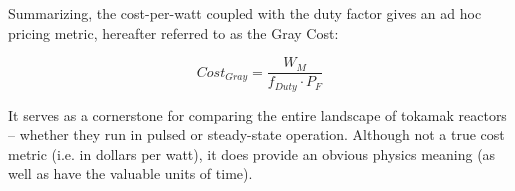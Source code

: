 Summarizing, the cost-per-watt coupled with the duty factor gives an ad hoc pricing metric, hereafter referred to as the Gray Cost:

\begin{equation}
	Cost_{Gray} = \frac{W_M}{f_{Duty} \cdot P_F}
\end{equation}

It serves as a cornerstone for comparing the entire landscape of tokamak reactors -- whether they run in pulsed or steady-state operation. Although not a true cost metric (i.e. in dollars per watt), it does provide an obvious physics meaning (as well as have the valuable units of time).

%
